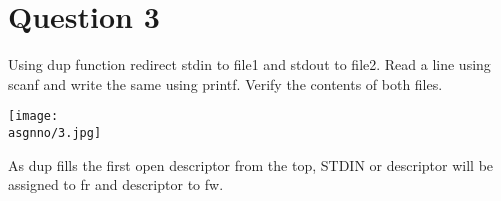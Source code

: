 \documentclass[main.tex]{subfiles}
\begin{document}
\section{Question 3}

Using dup function redirect stdin to file1 and stdout to file2. Read a line
using scanf and write the same using printf. Verify the contents of both files.


\centering\texttt{[image: \\asgnno/3.jpg]}

As dup fills the first open descriptor from the top, STDIN or  descriptor
will be assigned to fr and  descriptor to fw.
\end{document}
